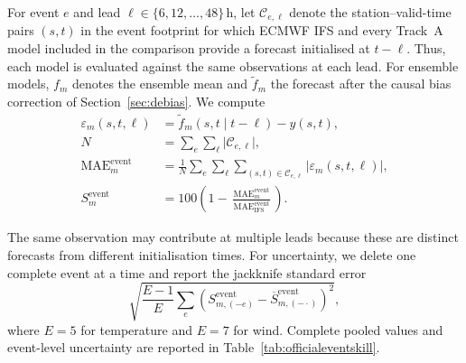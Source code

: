 \documentclass{article}
\newcommand{\numtable}[1]{%
  {\small\setlength{\tabcolsep}{6pt}\renewcommand{\arraystretch}{1.2}#1}%
}
\begin{document}
For event \(e\) and lead
\(\ell\in\{6,12,\ldots,48\}\,\mathrm{h}\), let
\(\mathcal{C}_{e,\ell}\) denote the station--valid-time pairs \((s,t)\) in
the event footprint for which ECMWF IFS and every Track~A model included in
the comparison provide a forecast initialised at \(t-\ell\). Thus, each
model is evaluated against the same observations at each lead. For ensemble
models, \(f_m\) denotes the ensemble mean and \(\widetilde{f}_m\) the
forecast after the causal bias correction of Section~\ref{sec:debias}. We
compute
\begin{equation}
\begin{aligned}
\varepsilon_m(s,t,\ell)
&= \widetilde{f}_m(s,t\mid t-\ell)-y(s,t),\\
N
&= \sum_e \sum_\ell \lvert\mathcal{C}_{e,\ell}\rvert,\\
\operatorname{MAE}^{\mathrm{event}}_m
&= \frac{1}{N}\sum_e\sum_\ell
\sum_{(s,t)\in\mathcal{C}_{e,\ell}}
\lvert\varepsilon_m(s,t,\ell)\rvert,\\
S^{\mathrm{event}}_m
&= 100\left(
1-\frac{\operatorname{MAE}^{\mathrm{event}}_m}
{\operatorname{MAE}^{\mathrm{event}}_{\mathrm{IFS}}}
\right).
\end{aligned}
\label{eq:eventskill}
\end{equation}

The same observation may contribute at multiple leads because these are
distinct forecasts from different initialisation times. For uncertainty, we
delete one complete event at a time and report the jackknife standard error
\[
\sqrt{\frac{E-1}{E}\sum_e
\left(S^{\mathrm{event}}_{m,(-e)}
-\overline{S}^{\mathrm{event}}_{m,(-\cdot)}\right)^2},
\]
where \(E=5\) for temperature and \(E=7\) for wind.
Complete pooled values and event-level uncertainty are reported in
Table~\ref{tab:officialeventskill}.

\begin{table}[htbp]
\centering
\caption{Source-defined event catalogue. The accompanying reproduction
package records the source URLs and selection basis for every event.}
\label{tab:officialeventcatalog}
\numtable{\resizebox{\textwidth}{!}{
}}
\end{table}

\begin{table}[htbp]
\centering
\caption{Event-case MAE skill (\%) relative to ECMWF IFS. Parentheses give
leave-one-event-out jackknife SE. Temperature uses five events and 231{,}065
common samples; wind uses seven events and 123{,}847 common samples.}
\label{tab:officialeventskill}
\numtable{\resizebox{0.78\textwidth}{!}{
}}
\end{table}

\FloatBarrier
\end{document}
